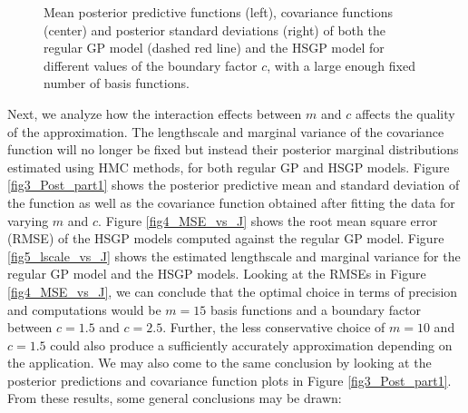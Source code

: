 \documentclass[onecolumn,a4paper,11pt]{article}
\begin{document}
\begin{figure}
\caption{Mean posterior predictive functions (left), covariance functions (center) and posterior standard deviations (right) of both the regular GP model (dashed red line) and the HSGP model for different values of the boundary factor $c$, with a large enough fixed number of basis functions.}
  \label{fig2_Post_L}
\end{figure}


Next, we analyze how the interaction effects between $m$ and $c$ affects the quality of the approximation. The lengthscale and marginal variance of the covariance function will no longer be fixed but instead their posterior marginal distributions estimated using HMC methods, for both regular GP and HSGP models. Figure \ref{fig3_Post_part1} shows the posterior predictive mean and standard deviation of the function as well as the covariance function obtained after fitting the data for varying $m$ and $c$. Figure \ref{fig4_MSE_vs_J} shows the root mean square error (RMSE) of the HSGP models computed against the regular GP model. Figure \ref{fig5_lscale_vs_J} shows the estimated lengthscale and marginal variance for the regular GP model and the HSGP models. Looking at the RMSEs in Figure \ref{fig4_MSE_vs_J}, we can conclude that the optimal choice in terms of precision and computations would be $m = 15$ basis functions and a boundary factor between $c = 1.5$ and $c = 2.5$. Further, the less conservative choice of $m = 10$ and $c = 1.5$  could also produce a sufficiently accurately approximation depending on the application. We may also come to the same conclusion by looking at the posterior predictions and covariance function plots in Figure \ref{fig3_Post_part1}. From these results, some general conclusions may be drawn:
\end{document}
